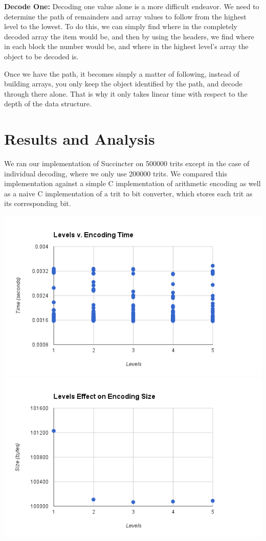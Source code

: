 \documentclass{article}
\begin{document}
\indent \textbf{Decode One:}
Decoding one value alone is a more difficult endeavor. We need to determine the path of remainders and array values to follow from the highest level to the lowest. 
To do this, we can simply find where in the completely decoded array the item would be, and then by using the headers, we find where in each block the number would be, and where in the highest level's array the object to be decoded is.

Once we have the path, it becomes simply a matter of following, instead of building arrays, you only keep the object identified by the path, and decode through there alone. That is why it only takes linear time with respect to the depth of the data structure.


\bigskip

\noindent \section{Results and Analysis}

We ran our implementation of Succincter on 500000 trits except in the case of individual decoding, where we only use 200000 trits. We compared this implementation against a simple C implementation of arithmetic encoding as well as a naive C implementation of a trit to bit converter, which stores each trit as its corresponding bit.

\includegraphics[scale=0.4]{images/betterlevel_v_encode}
\includegraphics[scale=0.4]{images/lvl_encodingsize}
\afterpage{\vfill}
\end{document}
